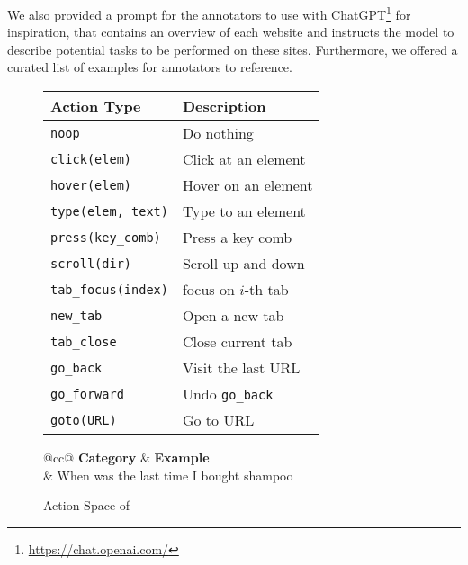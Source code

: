 We also provided a prompt for the annotators to use with ChatGPT\footnote{\url{https://chat.openai.com/}} for inspiration,
that contains an overview of each website and instructs the model to describe potential tasks to be performed on these sites.
Furthermore, we offered a curated list of examples for annotators to reference. 

\begin{figure}[t]
    \vspace{-10mm}
    \begin{minipage}{.4\textwidth}
        \footnotesize
        \begin{tabular}{@{}l|l@{}}
            \toprule
            \textbf{Action Type} & \textbf{Description} \\ \midrule
            \texttt{noop} & Do nothing  \\
            \texttt{click(elem)} & Click at an element  \\
            \texttt{hover(elem)} & Hover on an element \\
            \texttt{type(elem, text)} & Type to an element \\
            \texttt{press(key\_comb)} & Press a key comb  \\
            \texttt{scroll(dir)} & Scroll up and down \\
            \midrule
            \texttt{tab\_focus(index)} & focus on $i$-th tab\\
            \texttt{new\_tab} & Open a new tab  \\
            \texttt{tab\_close} & Close current tab \\ \midrule
            \texttt{go\_back} & Visit the last URL  \\
            \texttt{go\_forward} & Undo \texttt{go\_back} \\
            \texttt{goto(URL)} & Go to URL \\
            \bottomrule
        \end{tabular}
        \vspace{-3mm}
        \caption{Action Space of \ours{}}
        \label{tab:actions}
    \end{minipage}%
    \hfill
    \begin{minipage}{.53\textwidth}
    \footnotesize
        \begin{tabular}{@{}cc@{}}
            \toprule
            \textbf{Category} & \textbf{Example} \\
            \midrule
             & When was the last time I bought shampoo  \\

\end{tabular}
\end{minipage}
\end{figure}
